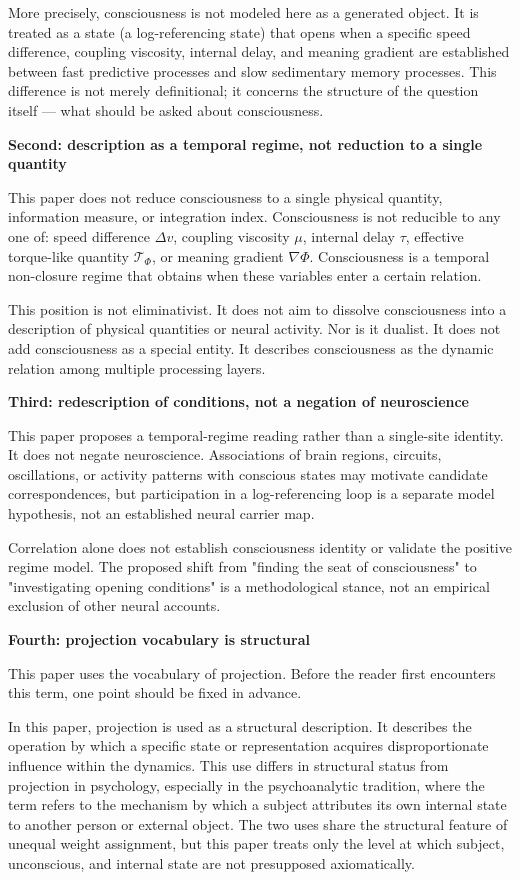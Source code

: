 More precisely, consciousness is not modeled here as a generated object. It is treated as a state (a log-referencing state) that opens when a specific speed difference, coupling viscosity, internal delay, and meaning gradient are established between fast predictive processes and slow sedimentary memory processes. This difference is not merely definitional; it concerns the structure of the question itself — what should be asked about consciousness.

\textbf{Second: description as a temporal regime, not reduction to a single quantity}

This paper does not reduce consciousness to a single physical quantity, information measure, or integration index. Consciousness is not reducible to any one of: speed difference $\Delta v$, coupling viscosity $\mu$, internal delay $\tau$, effective torque-like quantity $\mathcal{T}_{\Phi}$, or meaning gradient $\nabla\Phi$. Consciousness is a temporal non-closure regime that obtains when these variables enter a certain relation.

This position is not eliminativist. It does not aim to dissolve consciousness into a description of physical quantities or neural activity. Nor is it dualist. It does not add consciousness as a special entity. It describes consciousness as the dynamic relation among multiple processing layers.

\textbf{Third: redescription of conditions, not a negation of neuroscience}

This paper proposes a temporal-regime reading rather than a single-site identity. It does not negate neuroscience. Associations of brain regions, circuits, oscillations, or activity patterns with conscious states may motivate candidate correspondences, but participation in a log-referencing loop is a separate model hypothesis, not an established neural carrier map.

Correlation alone does not establish consciousness identity or validate the positive regime model. The proposed shift from "finding the seat of consciousness" to "investigating opening conditions" is a methodological stance, not an empirical exclusion of other neural accounts.

\textbf{Fourth: projection vocabulary is structural}

This paper uses the vocabulary of projection. Before the reader first encounters this term, one point should be fixed in advance.

In this paper, projection is used as a structural description. It describes the operation by which a specific state or representation acquires disproportionate influence within the dynamics. This use differs in structural status from projection in psychology, especially in the psychoanalytic tradition, where the term refers to the mechanism by which a subject attributes its own internal state to another person or external object. The two uses share the structural feature of unequal weight assignment, but this paper treats only the level at which subject, unconscious, and internal state are not presupposed axiomatically.

